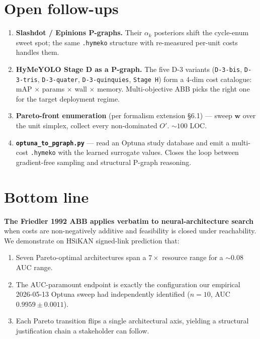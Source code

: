 \documentclass[11pt,a4paper]{article}
\newcommand{\code}[1]{\texttt{\small #1}}
\begin{document}
\section{Open follow-ups}

\begin{enumerate}
\item \textbf{Slashdot / Epinions P-graphs.} Their $\alpha_k$ posteriors
      shift the cycle-enum sweet spot; the same \code{.hymeko} structure
      with re-measured per-unit costs handles them.
\item \textbf{HyMeYOLO Stage D as a P-graph.} The five D-3 variants
      (\code{D-3-bis}, \code{D-3-tris}, \code{D-3-quater},
      \code{D-3-quinquies}, \code{Stage H}) form a 4-dim cost
      catalogue: mAP $\times$ params $\times$ wall $\times$
      memory. Multi-objective ABB picks the right one for the
      target deployment regime.
\item \textbf{Pareto-front enumeration} (per formalism extension
      \S 6.1) --- sweep $\boldsymbol{w}$ over the unit simplex,
      collect every non-dominated $O'$. ${\sim}100$ LOC.
\item \textbf{\code{optuna\_to\_pgraph.py}} --- read an Optuna study
      database and emit a multi-cost \code{.hymeko} with the
      learned surrogate values. Closes the loop between
      gradient-free sampling and structural P-graph reasoning.
\end{enumerate}

\section*{Bottom line}

\textbf{The Friedler 1992 ABB applies verbatim to neural-architecture
search} when costs are non-negatively additive and feasibility is
closed under reachability. We demonstrate on HSiKAN signed-link
prediction that:

\begin{enumerate}
\item Seven Pareto-optimal architectures span a $7\times$ resource
      range for a $\sim 0.08$ AUC range.
\item The AUC-paramount endpoint is exactly the configuration our
      empirical 2026-05-13 Optuna sweep had independently
      identified ($n{=}10$, AUC $0.9959 \pm 0.0011$).
\item Each Pareto transition flips a single architectural axis,
      yielding a structural justification chain a stakeholder
      can follow.
\end{enumerate}
\end{document}
